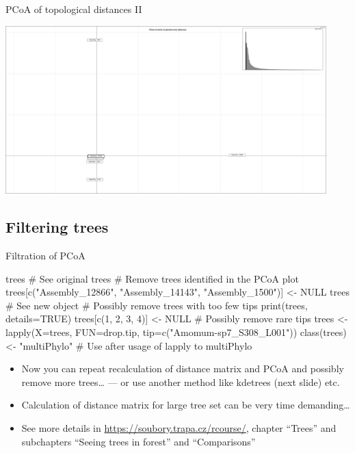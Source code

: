 \documentclass[compress,  xelatex, 11pt, xcolor=x11names, aspectratio=169,
	hyperref={
		bookmarks=true,
		unicode=true,
		colorlinks=true,
		pdftitle={HybSeq course},
		plainpages=false,
		pdfauthor={Vojtech Zeisek},
		pdfsubject={Practical processing of HybSeq target enrichment sequencing data on computing grids like MetaCentrum},
		pdfcreator={XeLaTeX},
		pdfkeywords={BASH, command line, GNU, HybSeq, Linux, MetaCentrum, sequencing shell, target enrichment},
		linkcolor=Turquoise4, %
		anchorcolor=DodgerBlue4, %
		citecolor=DodgerBlue4, %
		filecolor=DodgerBlue4, %
		menucolor=Tan4, %
		urlcolor=DarkOliveGreen4 %
		},
	url={hyphens, lowtilde} %
	]{beamer}
\begin{document}
\begin{frame}{PCoA of topological distances II}
	\begin{center}
		\includegraphics[height=6.5cm]{pcoa.png}
	\end{center}
\end{frame}

\subsection{Filtering trees}

\begin{frame}[fragile]{Filtration of PCoA}
	\begin{spluscode}
    trees # See original trees
    # Remove trees identified in the PCoA plot
    trees[c("Assembly_12866", "Assembly_14143", "Assembly_1500")] <- NULL
    trees # See new object
    # Possibly remove trees with too few tips
    print(trees, details=TRUE)
    trees[c(1, 2, 3, 4)] <- NULL
    # Possibly remove rare tips
    trees <- lapply(X=trees, FUN=drop.tip, tip=c("Amomum-sp7_S308_L001"))
    class(trees) <- "multiPhylo" # Use after usage of lapply to multiPhylo
	\end{spluscode}
	\begin{itemize}
		\item Now you can repeat recalculation of distance matrix and PCoA and possibly remove more trees\ldots{ }--- or use another method like kdetrees (next slide) etc.
		\item Calculation of distance matrix for large tree set can be very time demanding\ldots
		\item See more details in \url{https://soubory.trapa.cz/rcourse/}, chapter \enquote{Trees} and subchapters \enquote{Seeing trees in forest} and \enquote{Comparisons}
	\end{itemize}
\end{frame}
\end{document}
